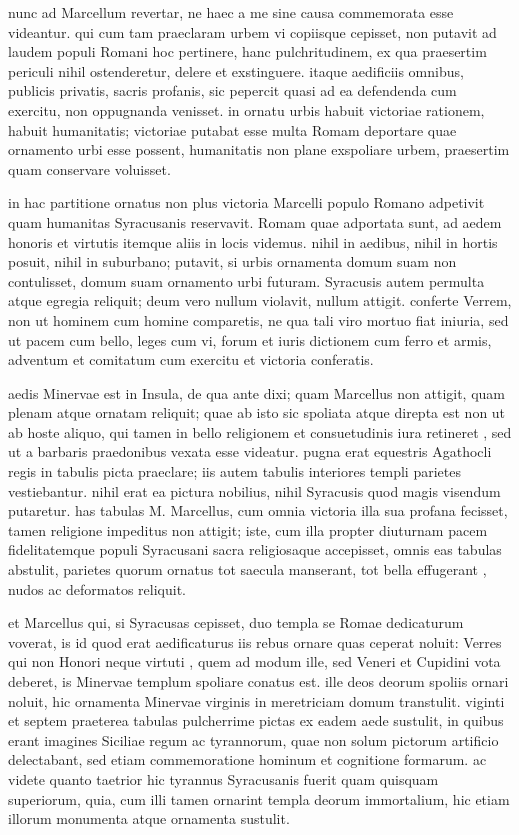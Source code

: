  nunc ad Marcellum revertar, ne haec a me sine causa commemorata esse videantur. qui cum tam praeclaram urbem vi copiisque cepisset, non putavit ad laudem populi Romani hoc pertinere, hanc pulchritudinem, ex qua praesertim periculi nihil ostenderetur, delere et exstinguere. itaque aedificiis omnibus, publicis privatis, sacris profanis, sic pepercit quasi ad ea defendenda cum exercitu, non oppugnanda venisset. in ornatu urbis habuit victoriae rationem, habuit humanitatis; victoriae putabat esse multa Romam deportare quae ornamento urbi esse possent, humanitatis non plane exspoliare urbem, praesertim quam conservare voluisset.

 in hac partitione ornatus non plus victoria Marcelli populo Romano adpetivit quam humanitas Syracusanis reservavit. Romam quae adportata sunt, ad aedem honoris et virtutis itemque aliis in locis videmus. nihil in aedibus, nihil in hortis posuit, nihil in suburbano; putavit, si urbis ornamenta domum suam non contulisset, domum suam ornamento urbi futuram. Syracusis autem permulta atque egregia reliquit; deum vero nullum violavit, nullum attigit. conferte Verrem, non ut hominem cum homine comparetis, ne qua tali viro mortuo fiat iniuria, sed ut pacem cum bello, leges cum vi, forum et iuris dictionem cum ferro et armis, adventum et comitatum cum exercitu et victoria conferatis.

 aedis Minervae est in Insula, de qua ante dixi; quam Marcellus non attigit, quam plenam atque ornatam reliquit; quae ab isto sic spoliata atque direpta est non ut ab hoste aliquo, qui tamen in bello religionem et consuetudinis iura retineret , sed ut a barbaris praedonibus vexata esse videatur. pugna erat equestris Agathocli regis in tabulis picta praeclare; iis autem tabulis interiores templi parietes vestiebantur. nihil erat ea pictura nobilius, nihil Syracusis quod magis visendum putaretur. has tabulas M. Marcellus, cum omnia victoria illa sua profana fecisset, tamen religione impeditus non attigit; iste, cum illa propter diuturnam pacem fidelitatemque populi Syracusani sacra religiosaque accepisset, omnis eas tabulas abstulit, parietes quorum ornatus tot saecula manserant, tot bella effugerant , nudos ac deformatos reliquit.

 et Marcellus qui, si Syracusas cepisset, duo templa se Romae dedicaturum voverat, is id quod erat aedificaturus iis rebus ornare quas ceperat noluit: Verres qui non Honori neque virtuti , quem ad modum ille, sed Veneri et Cupidini vota deberet, is Minervae templum spoliare conatus est. ille deos deorum spoliis ornari noluit, hic ornamenta Minervae virginis in meretriciam domum transtulit. viginti et septem praeterea tabulas pulcherrime pictas ex eadem aede sustulit, in quibus erant imagines Siciliae regum ac tyrannorum, quae non solum pictorum artificio delectabant, sed etiam commemoratione hominum et cognitione formarum. ac videte quanto taetrior hic tyrannus Syracusanis fuerit quam quisquam superiorum, quia, cum illi tamen ornarint templa deorum immortalium, hic etiam illorum monumenta atque ornamenta sustulit.

